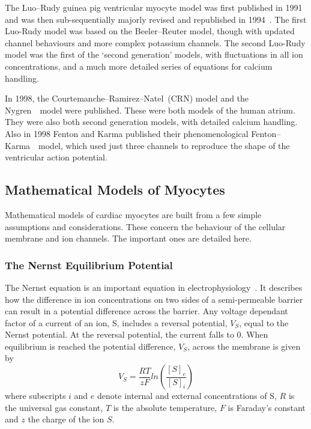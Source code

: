 The Luo--Rudy guinea pig ventricular myocyte model was first published in
1991~\cite{Luo1991} and was then sub-sequentially majorly revised and
republished in 1994~\cite{Luo1994}.
The first Luo-Rudy model was based on the Beeler--Reuter model, though with updated channel behaviours
and more complex potassium channels.
The second Luo-Rudy model was the first of the `second generation' models,
with fluctuations in all ion concentrations, and a much more detailed series of
equations for calcium handling.

In 1998, the Courtemanche--Ramirez--Natel\cite{CRN98}\ (CRN) model and the
Nygren~\cite{Nygren1998}\ model were published.
These were both models of the human atrium.
They were also both second generation models, with detailed calcium handling.
Also in 1998 Fenton and Karma published their phenomenological
Fenton--Karma~\cite{Fenton1998}\ model, which used just three channels to
reproduce the shape of the ventricular action potential.

\subsection{Mathematical Models of Myocytes}

Mathematical models of cardiac myocytes are built from a few simple assumptions
and considerations.
These concern the behaviour of the cellular membrane and ion channels.
The important ones are detailed here.

\subsubsection{The Nernst Equilibrium Potential}

The Nernst equation is an important equation in electrophysiology~\cite{Fall2002}.
It describes how the difference in ion concentrations on two sides of a
semi-permeable barrier can result in a potential difference across the barrier.
Any voltage dependant factor of a current of an ion, S, includes a reversal
potential, $V_{S}$, equal to the Nernst potential.
At the reversal potential, the current falls to 0.
When equilibrium is reached the potential difference, $V_{S}$, across the
membrane is given by
\begin{equation}
V_{S} = \frac{RT}{zF}ln\left( \frac{[S]_{e}}{[S]_{i}} \right) 
\end{equation} 
where subscripts $i$ and $e$ denote internal and external concentrations of S,
$R$ is the universal gas constant, $T$ is the absolute temperature, $F$ is
Faraday's constant and $z$ the charge of the ion $S$.

